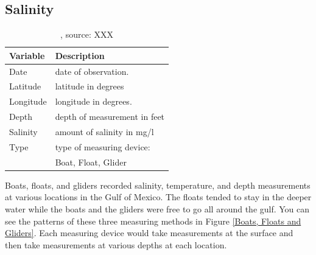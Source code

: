 \documentclass[authoryear,12pt]{elsarticle}
\begin{document}
\subsection{Salinity}

\begin{table}
\begin{tabular}{lp{9.5cm}}
\bf Variable & \bf Description \\\hline
Date & date of observation. \\
Latitude & latitude in degrees \\
Longitude & longitude in degrees. \\
Depth & depth of measurement in feet \\
Salinity &  amount of salinity in mg/l \\
Type &  type of measuring device: \\
& {\small Boat, Float, Glider} \\
\end{tabular}
\label{table.salinity}
\caption{, source: XXX}
\end{table}

Boats, floats, and gliders recorded salinity, temperature, and depth measurements at various locations in the Gulf of Mexico. The floats tended to stay in the deeper water while the boats and the gliders were free to go all around the gulf.  You can see the patterns of these three measuring methods in Figure \ref {Boats, Floats and Gliders}. Each measuring device would take measurements at the surface and then take measurements at various depths at each location.  
\end{document}
